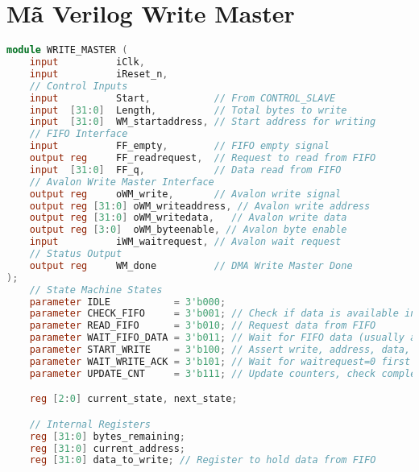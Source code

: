 \section{Mã Verilog Write Master}
\label{app:verilog_write_master}
\begin{lstlisting}[language=Verilog, caption={WRITE\_MASTER.v - Avalon Write Master Module}, label=lst:verilog_writemaster]
module WRITE_MASTER (
    input          iClk,
    input          iReset_n,
    // Control Inputs
    input          Start,           // From CONTROL_SLAVE
    input  [31:0]  Length,          // Total bytes to write
    input  [31:0]  WM_startaddress, // Start address for writing
    // FIFO Interface
    input          FF_empty,        // FIFO empty signal
    output reg     FF_readrequest,  // Request to read from FIFO
    input  [31:0]  FF_q,            // Data read from FIFO
    // Avalon Write Master Interface
    output reg     oWM_write,       // Avalon write signal
    output reg [31:0] oWM_writeaddress, // Avalon write address
    output reg [31:0] oWM_writedata,   // Avalon write data
    output reg [3:0]  oWM_byteenable, // Avalon byte enable
    input          iWM_waitrequest, // Avalon wait request
    // Status Output
    output reg     WM_done          // DMA Write Master Done
);
    // State Machine States
    parameter IDLE           = 3'b000;
    parameter CHECK_FIFO     = 3'b001; // Check if data is available in FIFO
    parameter READ_FIFO      = 3'b010; // Request data from FIFO
    parameter WAIT_FIFO_DATA = 3'b011; // Wait for FIFO data (usually available next cycle)
    parameter START_WRITE    = 3'b100; // Assert write, address, data, byteenable
    parameter WAIT_WRITE_ACK = 3'b101; // Wait for waitrequest=0 first time
    parameter UPDATE_CNT     = 3'b111; // Update counters, check completion

    reg [2:0] current_state, next_state;

    // Internal Registers
    reg [31:0] bytes_remaining;
    reg [31:0] current_address;
    reg [31:0] data_to_write; // Register to hold data from FIFO


\end{lstlisting}
